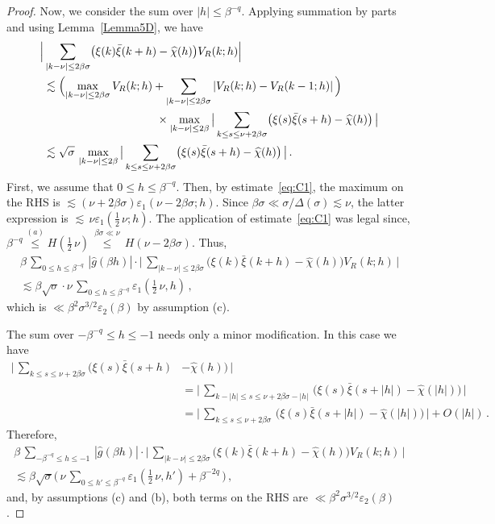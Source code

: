 \documentclass[11pt]{amsart}
\numberwithin{equation}{section}
\def\ep{{\varepsilon}}
\begin{document}
\begin{proof}
Now, we consider the sum over $|h|\le\beta^{-q}$.
Applying summation by parts and using Lemma~\ref{Lemma5D}, we have
\begin{align*}
\Bigl| &\sum_{|k-\nu|\le 2\beta\sigma}
\bigl( \xi(k)\bar\xi(k+h) - \widehat{\chi}(h) \bigr) V_R(k; h) \Bigr|
\\
&\lesssim
\Bigl(\max_{|k-\nu|\le 2\beta\sigma} V_R(k; h)+ \sum_{|k-\nu|\le 2\beta\sigma} |V_R(k; h)-V_R(k-1; h)|\,\Bigr) 
\\&\qquad\qquad\qquad\qquad\qquad\times
\max_{|k-\nu|\le 2\beta}\, \bigl|\,
\sum_{k\le s \le \nu +2\beta\sigma}
\bigl(  \xi(s)\bar\xi(s+h) - \widehat{\chi}(h) \bigr)\,
\bigr|
\\
&\lesssim
\sqrt{\sigma}\, \max_{|k-\nu|\le 2\beta}\, \bigl|\,
\sum_{k\le s \le \nu +2\beta\sigma}
\bigl(  \xi(s)\bar\xi(s+h) - \widehat{\chi}(h) \bigr)
\,\bigr|\,.
\end{align*}
First, we assume that $0\le h \le \beta^{-q}$. Then, by estimate~\eqref{eq:C1},
the maximum on the RHS is $ \lesssim (\nu + 2\beta\sigma)\ep_1(\nu-2\beta\sigma; h)$.
Since $\beta\sigma \ll \sigma/\Delta(\sigma) \lesssim \nu$, the latter expression is
$ \lesssim \, \nu\ep_1(\tfrac12\, \nu; h) $. The application of estimate~\eqref{eq:C1} was legal since,
$  \beta^{-q} \stackrel{(a)}\le H(\tfrac12\, \nu) \,
\stackrel{\beta\sigma\ll\nu}\le\, H(\nu-2\beta\sigma) $.
Thus,
\begin{multline*}
\beta\, \sum_{0\le h \le \beta^{-q}}\,
|\widehat{g}(\beta h)| \cdot
\bigl|\, \sum_{|k-\nu|\le 2\beta\sigma}
\bigl( \xi(k)\bar\xi(k+h) - \widehat{\chi}(h) \bigr) V_R(k; h) \,\bigr|
\\
\lesssim
\beta\sqrt{\sigma}\cdot \nu\, \sum_{0\le h \le \beta^{-q}} \ep_1(\tfrac12\, \nu, h)\,,
\end{multline*}
which is $\ll \beta^2\sigma^{3/2} \ep_2(\beta)$ by assumption (c).

The sum over $-\beta^{-q} \le h \le -1$ needs only a minor modification.
In this case we have
\begin{align*}
\bigl|\, \sum_{k\le s \le \nu +2\beta\sigma}
\bigl(  \xi(s)\bar\xi(s+h) &- \widehat{\chi}(h) \bigr) \,\bigr|\\
&= \bigl|\, \sum_{k-|h|\le s \le \nu +2\beta\sigma-|h|}\,
\bigl(  \xi(s)\bar\xi(s+|h|) - \widehat{\chi}(|h|) \bigr) \,\bigr| \\
&= \bigl|\, \sum_{k\le s \le \nu +2\beta\sigma}\,
\bigl(  \xi(s)\bar\xi(s+|h|) - \widehat{\chi}(|h|) \bigr) \,\bigr| + O(|h|)\,.
\end{align*}
Therefore,
\begin{multline*}
\beta\, \sum_{-\beta^{-q}\le h \le -1}\,
|\widehat{g}(\beta h)| \cdot
\bigl|\, \sum_{|k-\nu|\le 2\beta\sigma}
\bigl( \xi(k)\bar\xi(k+h) - \widehat{\chi}(h) \bigr) V_R(k; h) \,\bigr|
\\
\lesssim
\beta\sqrt{\sigma}\bigl(\, \nu\, \sum_{0\le h' \le \beta^{-q}} \ep_1(\tfrac12\, \nu, h')
+ \beta^{-2q}\,\bigr)\,,
\end{multline*}
and, by assumptions (c) and (b), both terms on the RHS are $\ll \beta^2\sigma^{3/2} \ep_2(\beta)$.


\end{proof}
\end{document}
